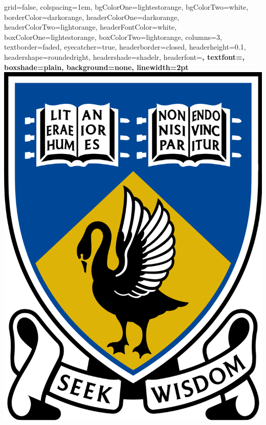 \documentclass[landscape,final,a0paper,fontscale=0.25]{baposter}
\begin{document}
\begin{poster}%
  {
  grid=false,
  colspacing=1em,
  bgColorOne=lightestorange,
  bgColorTwo=white,
  borderColor=darkorange,
  headerColorOne=darkorange,
  headerColorTwo=lightorange,
  headerFontColor=white,
  boxColorOne=lightestorange,
  boxColorTwo=lightorange,
  columns=3,
  textborder=faded,
  eyecatcher=true,
  headerborder=closed,
  headerheight=0.1\textheight,
  headershape=roundedright,
  headershade=shadelr,
  headerfont=\Large\bf\textsc, %
  textfont={\setlength{\parindent}{1.5em}},
  boxshade=plain,
  background=none,
  linewidth=2pt
  }
  {\includegraphics{images/1000px-UWA_crest}}
   

\end{poster}
\end{document}
